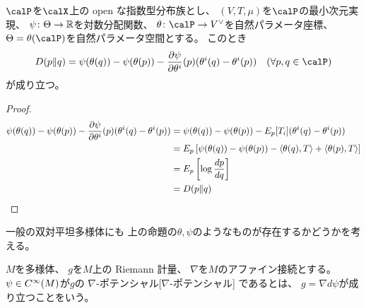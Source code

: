 \documentclass[report]{jlreq}
\begin{document}
\begin{proposition}[指数型分布族とKLダイバージェンス]
    $\calP$を$\calX$上の open な指数型分布族とし、
    $(V, T, \mu)$を$\calP$の最小次元実現、
    $\psi \colon \Theta \to \mathbb{R}$を対数分配関数、
    $\theta \colon \calP \to V^\vee$を自然パラメータ座標、
    $\Theta = \theta(\calP)$を自然パラメータ空間とする。
    このとき
    \begin{equation}
        D(p \| q)
            =
                \psi(\theta(q)) - \psi(\theta(p))
                    - \deldel[\psi]{\theta^i}(p)
                    (
                        \theta^i(q) - \theta^i(p)
                    )
                \quad
                (\forall p, q \in \calP)
    \end{equation}
    が成り立つ。
\end{proposition}

\begin{proof}
    \begin{alignat}{1}
        \psi(\theta(q)) - \psi(\theta(p))
            - \deldel[\psi]{\theta^i}(p)
            (
                \theta^i(q) - \theta^i(p)
            )
            &=
                \psi(\theta(q)) - \psi(\theta(p))
                    - E_p[T_i]
                    (
                        \theta^i(q) - \theta^i(p)
                    )
                \\
            &=
                E_p \mybracket{
                    \psi(\theta(q)) - \psi(\theta(p))
                        - \myangle{\theta(q)}{T}
                        + \myangle{\theta(p)}{T}
                }
                \\
            &=
                E_p \mybracket{
                    \log \frac{dp}{dq}
                }
                \\
            &=
                D(p \| q)
    \end{alignat}
\end{proof}

一般の双対平坦多様体にも
上の命題の$\theta, \psi$のようなものが存在するかどうかを考える。

\begin{definition}[ポテンシャル]
    $M$を多様体、
    $g$を$M$上の Riemann 計量、
    $\nabla$を$M$のアファイン接続とする。
    $\psi \in C^\infty(M)$が$g$の
        {$\nabla$-ポテンシャル}[$\nabla$-ポテンシャル]
    であるとは、
    $g = \nabla d\psi$が成り立つことをいう。
\end{definition}
\end{document}
